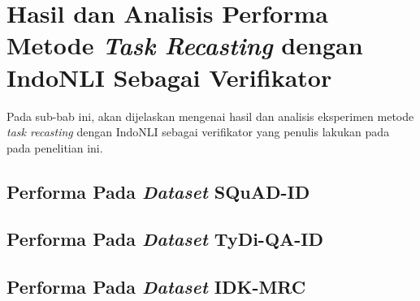 \section{Hasil dan Analisis Performa Metode \emph{Task Recasting} dengan IndoNLI Sebagai Verifikator}
Pada sub-bab ini, akan dijelaskan mengenai hasil dan analisis eksperimen metode \emph{task recasting} dengan IndoNLI sebagai verifikator yang penulis lakukan pada pada penelitian ini. 

\subsection{Performa Pada \emph{Dataset} SQuAD-ID}

\subsection{Performa Pada \emph{Dataset} TyDi-QA-ID}

\subsection{Performa Pada \emph{Dataset} IDK-MRC}
